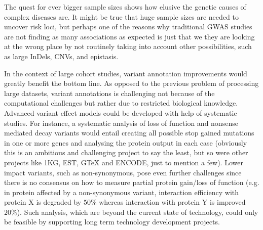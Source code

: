 The quest for ever bigger sample sizes shows how elusive the genetic causes of complex diseases are. 
It might be true that huge sample sizes are needed to uncover risk loci, but perhaps one of the reasons why traditional GWAS studies are not finding as many associations as expected is just that we they are looking at the wrong place by not routinely taking into account other possibilities, such as large InDels, CNVs, and epistasis.

In the context of large cohort studies, variant annotation improvements would greatly benefit the bottom line.
As opposed to the previous problem of processing large datasets, variant annotations is challenging not because of the computational challenges but rather due to restricted biological knowledge.
Advanced variant effect models could be developed with help of systematic studies.
For instance, a systematic analysis of loss of function and nonsense mediated decay variants would entail creating all possible stop gained mutations in one or more genes and analysing the protein output in each case (obviously this is an ambitious and challenging project to say the least, but so were other projects like 1KG, EST, GTeX and ENCODE, just to mention a few).
Lower impact variants, such as non-synonymous, pose even further challenges since there is no consensus on how to measure partial protein gain/loss of function (e.g. in protein affected by a non-synonymous variant, interaction efficiency with protein X is degraded by $50\%$ whereas interaction with protein Y is improved $20\%$).
Such analysis, which are beyond the current state of technology, could only be feasible by supporting long term technology development projects.

